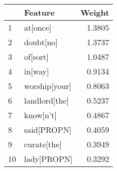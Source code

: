 \begin{tabular}{llr}
\toprule
{} &        Feature &  Weight \\
\midrule
1  &       at[once] &  1.3805 \\
2  &      doubt[no] &  1.3737 \\
3  &       of[sort] &  1.0487 \\
4  &        in[way] &  0.9134 \\
5  &  worship[your] &  0.8063 \\
6  &  landlord[the] &  0.5237 \\
7  &      know[n't] &  0.4867 \\
8  &    said[PROPN] &  0.4059 \\
9  &    curate[the] &  0.3949 \\
10 &    lady[PROPN] &  0.3292 \\
\bottomrule
\end{tabular}
